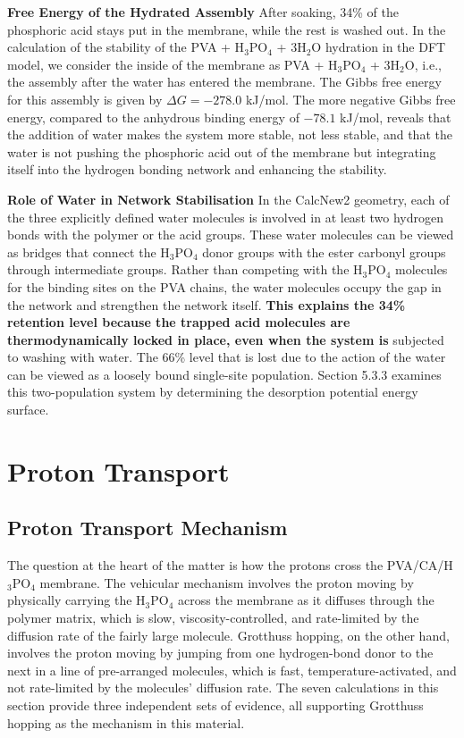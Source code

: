 \documentclass[12pt,a4paper]{report}
\begin{document}
\textbf{Free Energy of the Hydrated Assembly}
After soaking, 34\% of the phosphoric acid stays put in the membrane, while the rest is washed out. In the calculation of the stability of the PVA + H\(_3\)PO\(_4\) + 3H\(_2\)O hydration in the DFT model, we consider the inside of the membrane as PVA + H\(_3\)PO\(_4\) + 3H\(_2\)O, i.e., the assembly after the water has entered the membrane. The Gibbs free energy for this assembly is given by \(\Delta G = -278.0\) kJ/mol. The more negative Gibbs free energy, compared to the anhydrous binding energy of \(-78.1\) kJ/mol, reveals that the addition of water makes the system more stable, not less stable,\cite{63,64} and that the water is not pushing the phosphoric acid out of the membrane but integrating itself into the hydrogen bonding network and enhancing the stability.

\textbf{Role of Water in Network Stabilisation}
In the CalcNew2 geometry, each of the three explicitly defined water molecules is involved in at least two hydrogen bonds with the polymer or the acid groups. These water molecules can be viewed as bridges that connect the H\(_3\)PO\(_4\) donor groups with the ester carbonyl groups through intermediate groups. Rather than competing with the H\(_3\)PO\(_4\) molecules for the binding sites on the PVA chains, the water molecules occupy the gap in the network and strengthen the network itself.\cite{61,62,63} \textbf{This explains the 34\% retention level because the trapped acid molecules are thermodynamically locked in place, even when the system is }subjected to washing with water. The 66\% level that is lost due to the action of the water can be viewed as a loosely bound single-site population. Section 5.3.3 examines this two-population system by determining the desorption potential energy surface.

\section{Proton Transport}
\subsection{Proton Transport Mechanism}
The question at the heart of the matter is how the protons cross the PVA/CA/H\(_3\)PO\(_4\) membrane. The vehicular mechanism involves the proton moving by physically carrying the H\(_3\)PO\(_4\) across the membrane as it diffuses through the polymer matrix, which is slow, viscosity-controlled, and rate-limited by the diffusion rate of the fairly large molecule. Grotthuss hopping, on the other hand, involves the proton moving by jumping from one hydrogen-bond donor to the next in a line of pre-arranged molecules, which is fast, temperature-activated, and not rate-limited by the molecules’ diffusion rate.\cite{16, 17, 21} The seven calculations in this section provide three independent sets of evidence, all supporting Grotthuss hopping as the mechanism in this material.
\end{document}
